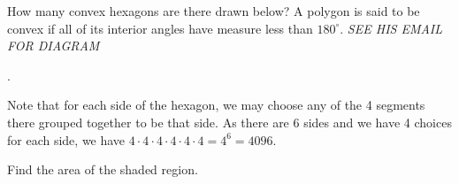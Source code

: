 \documentclass[11pt]{article}
\begin{document}
\begin{problem} How many convex hexagons are there drawn below? A polygon is said to be convex if all of its interior angles have measure less than $180^{\circ}$. \emph{SEE HIS EMAIL FOR DIAGRAM}
\end{problem}

\begin{answer} . \end{answer}
\begin{solution}
Note that for each side of the hexagon, we may choose any of the 4 segments there grouped together to be that side. As there are 6 sides and we have 4 choices for each side, we have $4 \cdot 4 \cdot 4 \cdot 4 \cdot 4 \cdot 4 = 4^6 = \boxed{4096}$.
\end{solution}

\begin{problem}Find the area of the shaded region.
	\begin{center}
	\end{center}
\end{problem}
\end{document}

